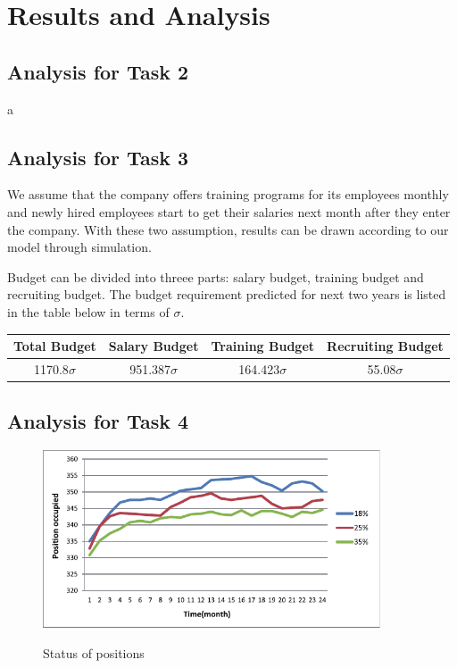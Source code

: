 \documentclass[12pt,a4paper,titlepage]{article}
\begin{document}
\section{Results and Analysis}
\label{sec:performance-and-analysis}

\subsection{Analysis for Task 2}
\label{sec:analysis-for-task-2}

a

\subsection{Analysis for Task 3}
\label{sec:analysis-for-task-3}

We assume that the company offers training programs for its employees monthly and newly hired employees start to get their salaries next month after they enter the company. With these two assumption, results can be drawn according to our model through simulation.

Budget can be divided into threee parts: salary budget, training budget and recruiting budget. The budget requirement predicted for next two years is listed in the table below in terms of $\sigma$.

\begin{tabular}{*{4}{c}}\toprule[2pt]
Total Budget & Salary Budget & Training Budget & Recruiting Budget\\ \midrule
1170.8$\sigma$ & 951.387$\sigma$ & 164.423$\sigma$ & 55.08$\sigma$ \\ \bottomrule[2pt]
\end{tabular}

\subsection{Analysis for Task 4}
\label{sec:analysis-for-task-4}


\begin{figure}[htb]
  \centering
  \includegraphics[width=10cm]{task4_p.pdf}\\
  \caption{Status of positions}\label{t4_p}
\end{figure}
\end{document}
